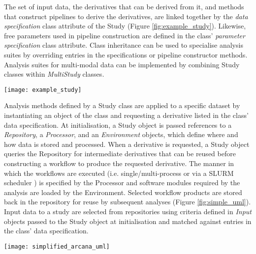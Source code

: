 \documentclass[smallextended]{svjour3}       %
\begin{document}
The set of input data, the derivatives that can be derived from it,
and methods that construct pipelines to derive the derivatives, are
linked together by the \emph{data specification} class attribute of the
Study (Figure \ref{fig:example_study}). Likewise,
free parameters used in pipeline construction are defined in the class'
\emph{parameter specification} class attribute. Class inheritance can
be used to specialise analysis suites by overriding entries in the
specifications or pipeline constructor methods. Analysis suites
for multi-modal data can be implemented by combining Study classes
within \emph{MultiStudy} classes\emph{.}

\begin{figure*}
    \centering
    \texttt{[image: example\_study]}
  \caption{Example study. Blue boxes represent input
data (filesets or fields) stored in a repository and green derivatives
from that data stored alongside the original data. Orange ovals are
pipelines that operate on data in the repository to derive the
derivatives. Arrows represent data flows, i.e., inputs and outputs to
pipelines}
\label{fig:example_study}
\end{figure*}

Analysis methods defined by a Study class are applied to a
specific dataset by instantiating an object of the class and
requesting a derivative listed in the class' data specification.
At initialisation, a Study object is passed references to a \emph{Repository},
a \emph{Processor}, and an \emph{Environment} objects, which
define where and how data is stored and processed. When a derivative is
requested, a Study object queries the Repository for intermediate
derivatives that can be reused before constructing a workflow to produce
the requested derivative. The manner in which the workflows are executed
(i.e. single/multi-process or via a SLURM scheduler \citep{yoo_slurm:_2003})
is specified by the Processor and software modules required by the analysis are
loaded by the Environment. Selected workflow products are
stored back in the repository for reuse by subsequent analyses (Figure
\ref{fig:simple_uml}). Input data to a study are selected from repositories
 using criteria defined in \emph{Input} objects passed to the Study
 object at initialisation and matched against entries in the class' data
specification.

\begin{figure*}
    \centering
    \texttt{[image: simplified\_arcana\_uml]}
  \caption{Unified Modelling Language (UML) diagram
of information flow in the Arcana framework. Boxes: Python classes,
blue=analysis-design, green=analysis-application. Arrows: orange=data,
magenta=workflow description, diamond=aggregated-in. Study classes
construct analysis pipelines, which are sent to the \emph{Processor} to
be processed. Input data is selected by \emph{Input} objects and
pulled to the compute environment to be processed along with existing
intermediate derivatives. After the derivatives are pushed back to the
repository.}
\label{fig:simple_uml}
\end{figure*}
\end{document}
